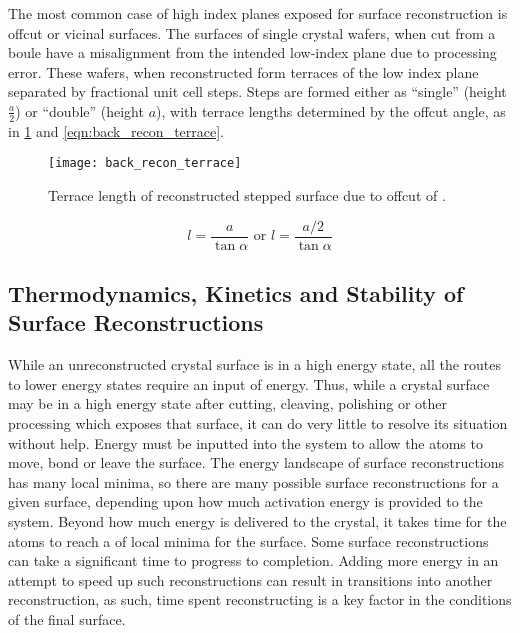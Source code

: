 The most common case of high index planes exposed for surface reconstruction is offcut or vicinal surfaces.
The surfaces of single crystal wafers, when cut from a boule have a misalignment from the intended low-index plane due to processing error.
These wafers, when reconstructed form terraces of the low index plane separated by fractional unit cell steps.
Steps are formed either as ``single'' (height \(\frac{a}{2}\)) or ``double'' (height \(a\)), with terrace lengths determined by the offcut angle, as in \cref{fig:back_recon_terrace} and \cref{eqn:back_recon_terrace}.
\begin{figure}
 \centering \texttt{[image: back\_recon\_terrace]}
 \caption{\label{fig:back_recon_terrace}Terrace length of reconstructed stepped surface due to offcut of \textalpha.}
\end{figure}
\begin{equation}
 l = \frac{a}{\tan{\alpha}} \text{ or } l = \frac{a/2}{\tan{\alpha}} \label{eqn:back_recon_terrace}
\end{equation}

\subsection{Thermodynamics, Kinetics and Stability of Surface Reconstructions} While an unreconstructed crystal surface is in a high energy state, all the routes to lower energy states require an input of energy.
Thus, while a crystal surface may be in a high energy state after cutting, cleaving, polishing or other processing which exposes that surface, it can do very little to resolve its situation without help.
Energy must be inputted into the system to allow the atoms to move, bond or leave the surface.
The energy landscape of surface reconstructions has many local minima, so there are many possible surface reconstructions for a given surface, depending upon how much activation energy is provided to the system.
Beyond how much energy is delivered to the crystal, it takes time for the atoms to reach a of local minima for the surface.
Some surface reconstructions can take a significant time to progress to completion.
Adding more energy in an attempt to speed up such reconstructions can result in transitions into another reconstruction, as such, time spent reconstructing is a key factor in the conditions of the final surface.


